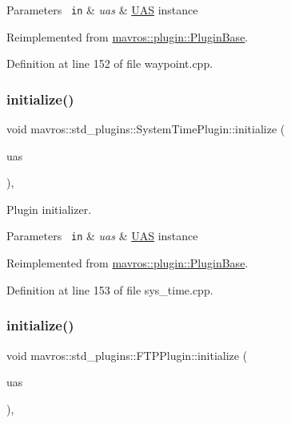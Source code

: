 \begin{DoxyParams}[1]{Parameters}
\mbox{\texttt{ in}}  & {\em uas} & {\ttfamily \mbox{\hyperlink{classmavros_1_1UAS}{U\+AS}}} instance \\
\hline
\end{DoxyParams}


Reimplemented from \mbox{\hyperlink{group__plugin_gad5313a41da4d26acbbabf008cdc21e82}{mavros\+::plugin\+::\+Plugin\+Base}}.



Definition at line 152 of file waypoint.\+cpp.

\mbox{\label{group__plugin_ga37f8fa27ccd8cf66cb81479cba446150}} 
\subsubsection{\texorpdfstring{initialize()}{initialize()}\hspace{0.1cm}{\footnotesize\ttfamily [38/41]}}
{\footnotesize\ttfamily void mavros\+::std\+\_\+plugins\+::\+System\+Time\+Plugin\+::initialize (\begin{DoxyParamCaption}\item[{\mbox{\hyperlink{classmavros_1_1UAS}{U\+AS}} \&}]{uas }\end{DoxyParamCaption})\hspace{0.3cm}{\ttfamily [inline]}, {\ttfamily [virtual]}}



Plugin initializer. 


\begin{DoxyParams}[1]{Parameters}
\mbox{\texttt{ in}}  & {\em uas} & {\ttfamily \mbox{\hyperlink{classmavros_1_1UAS}{U\+AS}}} instance \\
\hline
\end{DoxyParams}


Reimplemented from \mbox{\hyperlink{group__plugin_gad5313a41da4d26acbbabf008cdc21e82}{mavros\+::plugin\+::\+Plugin\+Base}}.



Definition at line 153 of file sys\+\_\+time.\+cpp.

\mbox{\label{group__plugin_ga7249eb6cdb3de93652df3b8cf3ea53c0}} 
\subsubsection{\texorpdfstring{initialize()}{initialize()}\hspace{0.1cm}{\footnotesize\ttfamily [39/41]}}
{\footnotesize\ttfamily void mavros\+::std\+\_\+plugins\+::\+F\+T\+P\+Plugin\+::initialize (\begin{DoxyParamCaption}\item[{\mbox{\hyperlink{classmavros_1_1UAS}{U\+AS}} \&}]{uas }\end{DoxyParamCaption})\hspace{0.3cm}{\ttfamily [inline]}, {\ttfamily [virtual]}}



